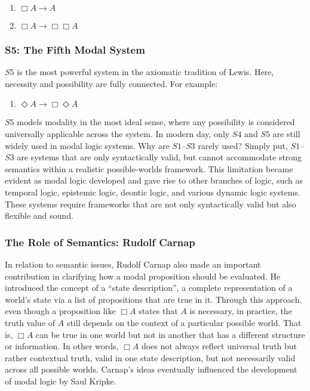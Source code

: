 \documentclass[12pt,a4paper,openany]{article}
\begin{document}
\begin{enumerate}
    \item $\Box A \to A$
    \item $\Box A \to \Box \Box A$
\end{enumerate}

\subsubsection{S5: The Fifth Modal System}

$S5$ is the most powerful system in the axiomatic tradition of Lewis. Here, necessity and possibility are fully connected. For example:

\begin{enumerate}
    \item $\Diamond A \to \Box \Diamond A$
\end{enumerate}

$S5$ models modality in the most ideal sense, where any possibility is considered universally applicable across the system. In modern day, only $S4$ and $S5$ are still widely used in modal logic systems. Why are $S1$--$S3$ rarely used? Simply put, $S1$--$S3$ are systems that are only syntactically valid, but cannot accommodate strong semantics within a realistic possible-worlds framework. This limitation became evident as modal logic developed and gave rise to other branches of logic, such as temporal logic, epistemic logic, deontic logic, and various dynamic logic systems. These systems require frameworks that are not only syntactically valid but also flexible and sound.

\subsubsection{The Role of Semantics: Rudolf Carnap}

In relation to semantic issues, Rudolf Carnap also made an important contribution in clarifying how a modal proposition should be evaluated. He introduced the concept of a ``state description'', a complete representation of a world's state via a list of propositions that are true in it. Through this approach, even though a proposition like $\Box A$ states that $A$ is necessary, in practice, the truth value of $A$ still depends on the context of a particular possible world. That is, $\Box A$ can be true in one world but not in another that has a different structure or information. In other words, $\Box A$ does not always reflect universal truth but rather contextual truth, valid in one state description, but not necessarily valid across all possible worlds. Carnap's ideas eventually influenced the development of modal logic by Saul Kripke.
\end{document}

